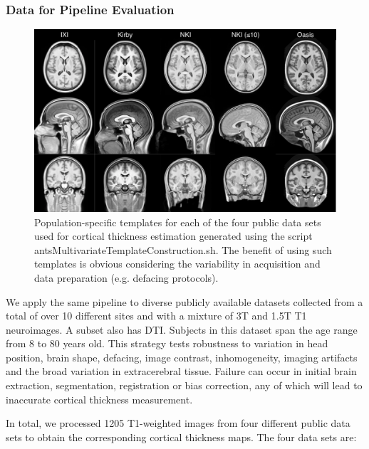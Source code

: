\subsubsection{Data for Pipeline Evaluation}

\begin{figure}
  \centering
  \includegraphics[width=120mm]{Figures/templates.pdf}
  \caption{Population-specific templates for each of the four public data sets used 
  for cortical thickness 
  estimation generated using the script antsMultivariateTemplateConstruction.sh. 
  The benefit of using such templates is obvious considering the variability in
  acquisition and data preparation (e.g. defacing protocols).
  }
  \label{fig:template}
\end{figure}

We apply the same pipeline to diverse publicly available datasets collected
from a total of over 10 different sites and with a mixture of 3T and
1.5T T1 neuroimages.  A subset also has DTI.  Subjects in this dataset
span the age range from 8 to 80 years old.  This strategy tests robustness to
variation in head position, brain shape, defacing, image contrast, inhomogeneity, imaging
artifacts and the broad variation in extracerebral tissue.  Failure
can occur in initial brain extraction, segmentation, registration or
bias correction, any of which will lead to inaccurate cortical
thickness measurement.                           

In total, we processed 1205 T1-weighted images from four different
public data sets to obtain the corresponding cortical thickness maps.                           
The four data sets are: 
                                          

